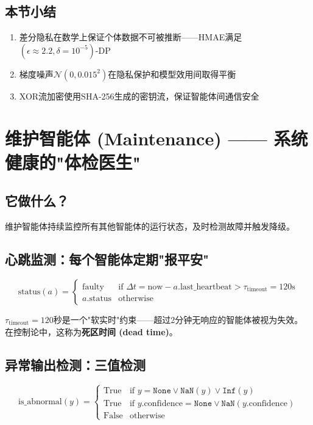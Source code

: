 \documentclass[11pt,a4paper]{ctexart}
\begin{document}
\subsection{本节小结}

\begin{enumerate}[nosep]
\item 差分隐私在数学上保证个体数据不可被推断——HMAE满足$(\epsilon \approx 2.2, \delta = 10^{-5})$-DP
\item 梯度噪声$\mathcal{N}(0, 0.015^2)$在隐私保护和模型效用间取得平衡
\item XOR流加密使用SHA-256生成的密钥流，保证智能体间通信安全
\end{enumerate}

\newpage

\section{维护智能体 (Maintenance) —— 系统健康的"体检医生"}

\subsection{它做什么？}

维护智能体持续监控所有其他智能体的运行状态，及时检测故障并触发降级。

\subsection{心跳监测：每个智能体定期"报平安"}

$$\text{status}(a) = \begin{cases}
\text{faulty} & \text{if } \Delta t = \text{now} - a.\text{last\_heartbeat} > \tau_{\text{timeout}} = 120\text{s} \\
a.\text{status} & \text{otherwise}
\end{cases}$$

$\tau_{\text{timeout}} = 120$秒是一个"软实时"约束——超过2分钟无响应的智能体被视为失效。
在控制论中，这称为\textbf{死区时间 (dead time)}。

\subsection{异常输出检测：三值检测}

$$\text{is\_abnormal}(y) = \begin{cases}
\text{True} & \text{if } y = \texttt{None} \lor \texttt{NaN}(y) \lor \texttt{Inf}(y) \\
\text{True} & \text{if } y.\text{confidence} = \texttt{None} \lor \texttt{NaN}(y.\text{confidence}) \\
\text{False} & \text{otherwise}
\end{cases}$$
\end{document}
